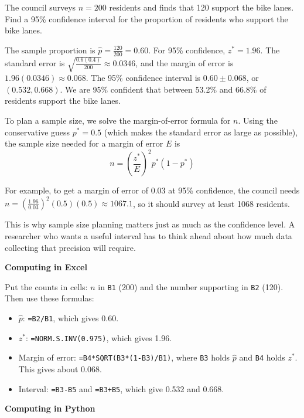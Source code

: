 \begin{Worked}
\begin{Problem}
The council surveys $n = 200$ residents and finds that 120 support the bike lanes. Find a 95\% confidence interval for the proportion of residents who support the bike lanes.
\end{Problem}
\begin{Solution}
The sample proportion is $\hat{p} = \frac{120}{200} = 0.60$. For 95\% confidence, $z^* = 1.96$. The standard error is $\sqrt{\frac{0.6(0.4)}{200}} \approx 0.0346$, and the margin of error is $1.96(0.0346) \approx 0.068$. The 95\% confidence interval is $0.60 \pm 0.068$, or $(0.532, 0.668)$. We are 95\% confident that between 53.2\% and 66.8\% of residents support the bike lanes.
\end{Solution}
\end{Worked}

To plan a sample size, we solve the margin-of-error formula for $n$. Using the conservative guess $p^* = 0.5$ (which makes the standard error as large as possible), the sample size needed for a margin of error $E$ is
$$n = \left(\frac{z^*}{E}\right)^2 p^*(1 - p^*)$$

For example, to get a margin of error of 0.03 at 95\% confidence, the council needs $n = \left(\frac{1.96}{0.03}\right)^2(0.5)(0.5) \approx 1067.1$, so it should survey at least 1068 residents.

This is why sample size planning matters just as much as the confidence
level. A researcher who wants a useful interval has to think ahead about how
much data collecting that precision will require.

\textbf{Computing in Excel}

Put the counts in cells: $n$ in \texttt{B1} (200) and the number supporting in \texttt{B2} (120). Then use these formulas:
\begin{itemize}
\item $\hat{p}$: \texttt{=B2/B1}, which gives 0.60.
\item $z^*$: \texttt{=NORM.S.INV(0.975)}, which gives 1.96.
\item Margin of error: \texttt{=B4*SQRT(B3*(1-B3)/B1)}, where \texttt{B3} holds $\hat{p}$ and \texttt{B4} holds $z^*$. This gives about 0.068.
\item Interval: \texttt{=B3-B5} and \texttt{=B3+B5}, which give 0.532 and 0.668.
\end{itemize}

\textbf{Computing in Python}

